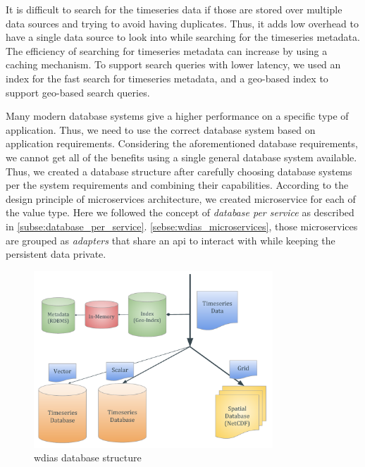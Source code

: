 It is difficult to search for the timeseries data if those are stored over multiple data sources and trying to avoid having duplicates. Thus, it adds low overhead to have a single data source to look into while searching for the timeseries metadata. The efficiency of searching for timeseries metadata can increase by using a caching mechanism. To support search queries with lower latency, we used an index for the fast search for timeseries metadata, and a geo-based index to support geo-based search queries.

Many modern database systems give a higher performance on a specific type of application. Thus, we need to use the correct database system based on application requirements. Considering the aforementioned database requirements, we cannot get all of the benefits using a single general database system available. Thus, we created a database structure after carefully choosing database systems per the system requirements and combining their capabilities. According to the design principle of microservices architecture, we created microservice for each of the value type. Here we followed the concept of \emph{database per service} as described in \cref{subse:database_per_service}. \cref{sebse:wdias_microservices}, those microservices are grouped as \emph{adapters} that share an \acrshort{api} to interact with while keeping the persistent data private.

\begin{figure}[htp]
    \centering
    \includegraphics[width=0.8\textwidth]{method/microservice/wdias_database_structure.pdf}
    \caption{\acrshort{wdias} database structure}
    \label{fi:database_structure}
\end{figure}



